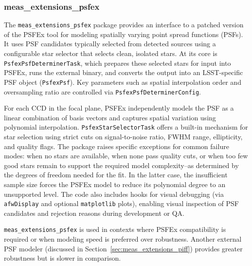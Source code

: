 \subsubsection{meas\_extensions\_psfex}\label{sec:meas_extensions_psfex}

The \texttt{meas\_extensions\_psfex} package provides an interface to a patched version of the PSFEx tool \citep{2011ASPC..442..435B} for modeling spatially varying point spread functions (PSFs).
It uses PSF candidates typically selected from detected sources using a configurable star selector that selects clean, isolated stars.
At its core is \texttt{PsfexPsfDeterminerTask}, which prepares these selected stars for input into PSFEx, runs the external binary, and converts the output into an LSST-specific PSF object (\texttt{PsfexPsf}).
Key parameters such as spatial interpolation order and oversampling ratio are controlled via \texttt{PsfexPsfDeterminerConfig}.

For each CCD in the focal plane, PSFEx independently models the PSF as a linear combination of basis vectors and captures spatial variation using polynomial interpolation.
\texttt{PsfexStarSelectorTask} offers a built-in mechanism for star selection using strict cuts on signal-to-noise ratio, FWHM range, ellipticity, and quality flags.
The package raises specific exceptions for common failure modes: when no stars are available, when none pass quality cuts, or when too few good stars remain to support the required model complexity--as determined by the degrees of freedom needed for the fit.
In the latter case, the insufficient sample size forces the PSFEx model to reduce its polynomial degree to an unsupported level.
The code also includes hooks for visual debugging (via \texttt{afwDisplay} and optional \texttt{matplotlib} plots), enabling visual inspection of PSF candidates and rejection reasons during development or QA.

\texttt{meas\_extensions\_psfex} is used in contexts where PSFEx compatibility is required or when modeling speed is preferred over robustness.
Another external PSF modeler (discussed in Section~\ref{sec:meas_extensions_piff}) provides greater robustness but is slower in comparison.
